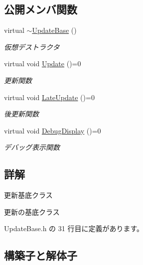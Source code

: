 \subsection*{公開メンバ関数}
\begin{DoxyCompactItemize}
\item 
virtual \mbox{\hyperlink{class_update_base_aad4c3e15c4b67871a0fe13c9f85e5918}{$\sim$\+Update\+Base}} ()
\begin{DoxyCompactList}\small\item\em 仮想デストラクタ \end{DoxyCompactList}\item 
virtual void \mbox{\hyperlink{class_update_base_a9fdc8924001cf6fa89c1f5fa0d867682}{Update}} ()=0
\begin{DoxyCompactList}\small\item\em 更新関数 \end{DoxyCompactList}\item 
virtual void \mbox{\hyperlink{class_update_base_afc4956f78135aed5fc4e4f9991be50b9}{Late\+Update}} ()=0
\begin{DoxyCompactList}\small\item\em 後更新関数 \end{DoxyCompactList}\item 
virtual void \mbox{\hyperlink{class_update_base_a5c63c3c3ef1b85f3701718ec3f7b39e2}{Debug\+Display}} ()=0
\begin{DoxyCompactList}\small\item\em デバッグ表示関数 \end{DoxyCompactList}\end{DoxyCompactItemize}


\subsection{詳解}
更新基底クラス 

更新の基底クラス 

 Update\+Base.\+h の 31 行目に定義があります。



\subsection{構築子と解体子}
\mbox{\label{class_update_base_aad4c3e15c4b67871a0fe13c9f85e5918}} 
